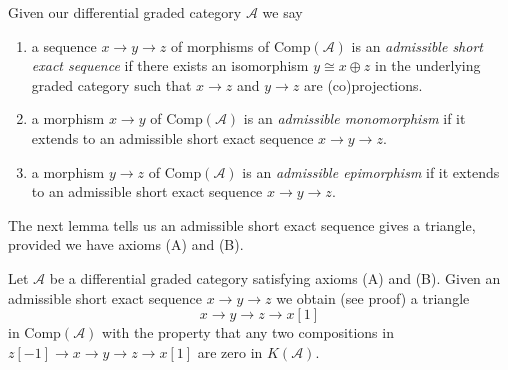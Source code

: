 \noindent
Given our differential graded category $\mathcal{A}$ we say
\begin{enumerate}
\item a sequence $x \to y \to z$ of morphisms of $\text{Comp}(\mathcal{A})$
is an {\it admissible short exact sequence} if there exists
an isomorphism $y \cong x \oplus z$ in the underlying graded category
such that $x \to z$ and $y \to z$ are (co)projections.
\item a morphism $x\to y$ of $\text{Comp}(\mathcal{A})$ is an
{\it admissible monomorphism} if it extends to an
admissible short exact sequence $x\to y\to z$.
\item a morphism $y\to z$ of $\text{Comp}(\mathcal{A})$ is an
{\it admissible epimorphism} if it extends to an
admissible short exact sequence $x\to y\to z$.
\end{enumerate}
The next lemma tells us an admissible short exact sequence gives a
triangle, provided we have axioms (A) and (B).

\begin{lemma}
\label{lemma-get-triangle}
Let $\mathcal{A}$ be a differential graded category satisfying
axioms (A) and (B). Given an admissible short exact sequence
$x \to y \to z$ we obtain (see proof) a triangle
$$
x \to y \to z \to x[1]
$$
in $\text{Comp}(\mathcal{A})$ with the property that any two compositions
in $z[-1] \to x \to y \to z \to x[1]$ are zero in $K(\mathcal{A})$.
\end{lemma}

